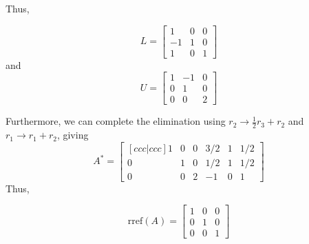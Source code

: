 Thus,
\begin{mdframed}[style=MyFrame]
    \begin{equation}
        L =
        \begin{bmatrix}
            1       &   0   &   0    \\
            -1      &   1   &   0   \\
            1       &   0  &   1
        \end{bmatrix}
    \end{equation}
    and
    \begin{equation}
        U =
        \begin{bmatrix}
            1       &   -1  &   0    \\
            0       &   1   &   0   \\
            0       &   0   &   2
        \end{bmatrix}
    \end{equation}
\end{mdframed}
Furthermore, we can complete the elimination using $r_{2}\rightarrow
\frac{1}{2}r_{3} + r_{2}$ and $r_{1} \rightarrow r_{1} + r_{2}$, giving 
\begin{equation}
    A^{\ast} =
    \begin{bmatrix}[ccc|ccc]
        1       &   0  &   0    &   3/2     &   1   &   1/2   \\
        0       &   1   &  0    &   1/2     &   1   &   1/2   \\
        0       &   0   &   2   &   -1      &   0   &   1
    \end{bmatrix}
\end{equation}
Thus,
\begin{mdframed}[style=MyFrame]
    \begin{equation}
        \text{rref}(A) =
        \begin{bmatrix}
            1       &      0    &   0   \\
            0       &      1    &   0   \\
            0       &      0    &   1
        \end{bmatrix}
    \end{equation}
\end{mdframed}
